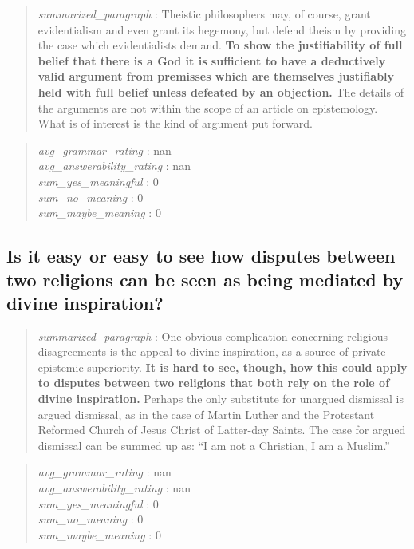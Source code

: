 \begin{quote}
\emph{summarized\_paragraph} : Theistic philosophers may, of course,
grant evidentialism and even grant its hegemony, but defend theism by
providing the case which evidentialists demand. \textbf{To show the
justifiability of full belief that there is a God it is sufficient to
have a deductively valid argument from premisses which are themselves
justifiably held with full belief unless defeated by an objection.} The
details of the arguments are not within the scope of an article on
epistemology. What is of interest is the kind of argument put forward.
\end{quote}

\begin{quote}
\emph{avg\_grammar\_rating} : nan\\
\emph{avg\_answerability\_rating} : nan\\
\emph{sum\_yes\_meaningful} : 0\\
\emph{sum\_no\_meaning} : 0\\
\emph{sum\_maybe\_meaning} : 0
\end{quote}

\hypertarget{is-it-easy-or-easy-to-see-how-disputes-between-two-religions-can-be-seen-as-being-mediated-by-divine-inspiration}{%
\subsection{Is it easy or easy to see how disputes between two religions
can be seen as being mediated by divine
inspiration?}\label{is-it-easy-or-easy-to-see-how-disputes-between-two-religions-can-be-seen-as-being-mediated-by-divine-inspiration}}

\begin{quote}
\emph{summarized\_paragraph} : One obvious complication concerning
religious disagreements is the appeal to divine inspiration, as a source
of private epistemic superiority. \textbf{It is hard to see, though, how
this could apply to disputes between two religions that both rely on the
role of divine inspiration.} Perhaps the only substitute for unargued
dismissal is argued dismissal, as in the case of Martin Luther and the
Protestant Reformed Church of Jesus Christ of Latter-day Saints. The
case for argued dismissal can be summed up as: ``I am not a Christian, I
am a Muslim.''
\end{quote}

\begin{quote}
\emph{avg\_grammar\_rating} : nan\\
\emph{avg\_answerability\_rating} : nan\\
\emph{sum\_yes\_meaningful} : 0\\
\emph{sum\_no\_meaning} : 0\\
\emph{sum\_maybe\_meaning} : 0
\end{quote}

